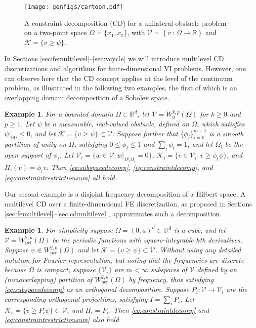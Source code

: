 \documentclass[letterpaper,final,12pt,reqno]{amsart}
\theoremstyle{cstyle}
\theoremstyle{cstyle*}
\theoremstyle{dstyle}
\newtheorem{example}[theorem]{Example}
\numberwithin{equation}{section}
\numberwithin{figure}{section}
\numberwithin{table}{section}
\numberwithin{theorem}{section}
\newcommand{\RR}{\mathbb{R}}
\newcommand{\cK}{\mathcal{K}}
\newcommand{\cV}{\mathcal{V}}
\begin{document}
\begin{figure}[ht]
\texttt{[image: genfigs/cartoon.pdf]}
\caption{A constraint decomposition (CD) for a unilateral obstacle problem on a two-point space $\Omega=\{x_1,x_2\}$, with $\mathcal{V}=\left\{v \,:\, \Omega \to \RR\right\}$ and $\mathcal{K}=\{v\ge \psi\}$.}
\label{fig:cartoon}
\end{figure}

In Sections \ref{sec:femultilevel}--\ref{sec:vcycle} we will introduce multilevel CD discretizations and algorithms for finite-dimensional VI problems.  However, one can observe here that the CD concept applies at the level of the continuum problem, as illustrated in the following two examples, the first of which is an overlapping domain decomposition of a Sobolev space.

\begin{example}  \label{ex:domaindecomposition}  For a bounded domain $\Omega \subset \RR^d$, let $\cV = W_0^{k,p}(\Omega)$ for $k\ge 0$ and $p\ge 1$.  Let $\psi$ be a measurable, real-valued obstacle, defined on $\Omega$, which satisfies $\psi|_{\partial \Omega} \le 0$, and let $\cK = \{v \ge \psi\} \subset \cV$.  Suppose further that $\{\phi_i\}_{i=0}^{m-1}$ is a smooth partition of unity on $\Omega$, satisfying $0 \le \phi_i\le 1$ and $\sum_i \phi_i = 1$, and let $\Omega_i$ be the open support of $\phi_i$.  Let $\cV_i = \{w \in \cV:w|_{\Omega \setminus \Omega_i} =0 \}$, $\cK_i = \{v \in \cV_i: v \ge \phi_i \psi\}$, and $\Pi_i(v) = \phi_i v$.  Then \eqref{eq:subspacedecomp}, \eqref{eq:constraintdecomp}, and \eqref{eq:constraintrestrictionsum} all hold.
\end{example}

Our second example is a disjoint frequency decomposition of a Hilbert space.  A multilevel CD over a finite-dimensional FE discretization, as proposed in Sections \ref{sec:femultilevel}--\ref{sec:cdmultilevel}, approximates such a decomposition.

\begin{example}  \label{ex:frequencydecomposition}  For simplicity suppose $\Omega = (0,a)^d \subset \RR^d$ is a cube, and let $\cV = W_{\text{per}}^{2,k}(\Omega)$ be the periodic functions with square-integrable $k$th derivatives.  Suppose $\psi \in W_{\text{per}}^{2,k}(\Omega)$ and let $\cK = \{v \ge \psi\} \subset \cV$.  Without using any detailed notation for Fourier representation, but noting that the frequencies are discrete because $\Omega$ is compact, suppose $\{\cV_i\}$ are $m<\infty$ subspaces of $\cV$ defined by an (nonoverlapping) partition of $W_{\text{per}}^{2,k}(\Omega)$ by frequency, thus satisfying \eqref{eq:subspacedecomp} as an orthogonal decomposition.  Suppose $P_i:\cV \to \cV_i$ are the corresponding orthogonal projections, satisfying $I = \sum_i P_i$.  Let $\cK_i = \{v \ge P_i \psi\} \subset \cV_i$ and $\Pi_i = P_i$.  Then \eqref{eq:constraintdecomp} and \eqref{eq:constraintrestrictionsum} also hold.
\end{example}
\end{document}

